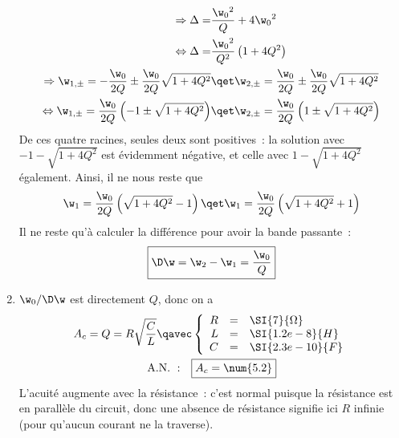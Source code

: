 \documentclass[a4paper, 12pt, final, garamond]{book}
\begin{document}
\begin{enumerate}
\begin{align*}
            \Rightarrow
            \Delta = &\frac{\w_0{}^2}{Q} + 4\w_0{}^2\\
            \Leftrightarrow
            \Delta = &\frac{\w_0{}^2}{Q^2} \left( 1 + 4Q^2 \right)\\
            \Rightarrow
            \w_{1,\pm} = -\frac{\w_0}{2Q} \pm \frac{\w_0}{2Q} \sqrt{1+4Q^2}
            &\qet
            \w_{2,\pm} = \frac{\w_0}{2Q} \pm \frac{\w_0}{2Q} \sqrt{1+4Q^2}\\
            \Leftrightarrow
            \w_{1,\pm} = \frac{\w_0}{2Q} \left(-1 \pm \sqrt{1+4Q^2}\right)
            &\qet
            \w_{2,\pm} = \frac{\w_0}{2Q} \left(1 \pm \sqrt{1+4Q^2}\right)
        \end{align*}
        De ces quatre racines, seules deux sont positives~: la solution avec $-1 -
        \sqrt{1+4Q^2}$ est évidemment négative, et celle avec $1 - \sqrt{1+4Q^2}$
        également. Ainsi, il ne nous reste que
        \begin{gather*}
            \w_1 = \frac{\w_0}{2Q} \left( \sqrt{1+4Q^2}-1 \right)
            \qet
            \w_1 = \frac{\w_0}{2Q} \left( \sqrt{1+4Q^2}+1 \right)
        \end{gather*}
        Il ne reste qu'à calculer la différence pour avoir la bande passante~:
        \begin{gather*}
            \boxed{\D\w = \w_2 - \w_1 = \frac{\w_0}{Q}}
        \end{gather*}
    \item $\w_0/\D\w$ est directement $Q$, donc on a
        \begin{gather*}
            A_c = Q = R \sqrt{\frac{C}{L}}
            \qavec
            \left\{
                \begin{array}{rcl}
                    R & = & \SI{7}{\Omega}\\
                    L & = & \SI{1.2e-8}{H}\\
                    C & = & \SI{2.3e-10}{F}
                \end{array}
            \right.\\
            \mathrm{A.N.~:}\quad
            \boxed{A_c = \num{5.2}}
        \end{gather*}
        L'acuité augmente avec la résistance~: c'est normal puisque la
        résistance est en parallèle du circuit, donc une absence de résistance
        signifie ici $R$ infinie (pour qu'aucun courant ne la traverse).
\end{enumerate}
\end{document}
